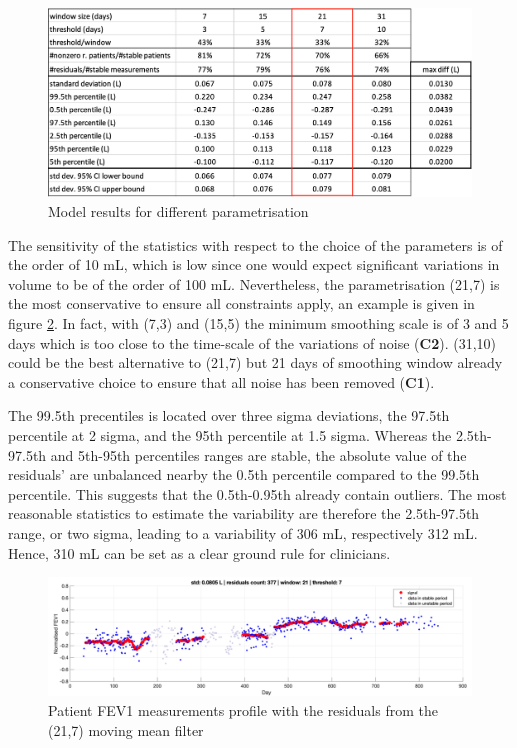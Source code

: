 \begin{figure}[!h]
    \centering
    \includegraphics[width=140mm]{images/variabilitytable.png}
    \caption{Model results for different parametrisation}
    \label{fig:variability}
\end{figure}

The sensitivity of the statistics with respect to the choice of the parameters is of the order of 10 mL, which is low since one would expect significant variations in volume to be of the order of 100 mL. Nevertheless, the parametrisation (21,7) is the most conservative to ensure all constraints apply, an example is given in figure \ref{fig:fev1profile}. In fact, with (7,3) and (15,5) the minimum smoothing scale is of 3 and 5 days which is too close to the time-scale of the variations of noise (\textbf{C2}). (31,10) could be the best alternative to (21,7) but 21 days of smoothing window already a conservative choice to ensure that all noise has been removed (\textbf{C1}). 

The 99.5th precentiles is located over three sigma deviations, the 97.5th percentile at 2 sigma, and the 95th percentile at 1.5 sigma. Whereas the 2.5th-97.5th and 5th-95th percentiles ranges are stable, the absolute value of the residuals' are unbalanced nearby the 0.5th percentile compared to the 99.5th percentile. This suggests that the 0.5th-0.95th already contain outliers. The most reasonable statistics to estimate the variability are therefore the 2.5th-97.5th range, or two sigma, leading to a variability of 306 mL, respectively 312 mL. Hence, 310 mL can be set as a clear ground rule for clinicians.

\begin{figure}[!h]
    \centering
    \includegraphics[width=150mm]{images/fevMovingAvg_patient103_w21_t7.png}
    \caption{Patient FEV1 measurements profile with the residuals from the (21,7) moving mean filter}
    \label{fig:fev1profile}
\end{figure}
